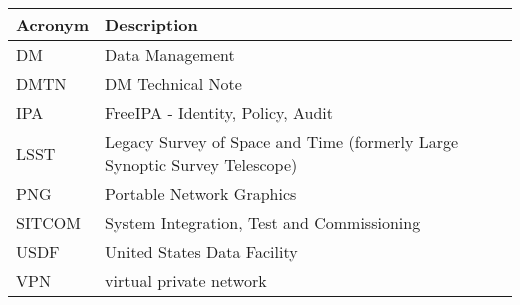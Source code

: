 \addtocounter{table}{-1}
\begin{longtable}{p{}p{}}\hline
\textbf{Acronym} & \textbf{Description}  \\\hline

DM & Data Management \\\hline
DMTN & DM Technical Note \\\hline
IPA & FreeIPA - Identity, Policy, Audit \\\hline
LSST & Legacy Survey of Space and Time (formerly Large Synoptic Survey Telescope) \\\hline
PNG & Portable Network Graphics \\\hline
SITCOM & System Integration, Test and Commissioning \\\hline
USDF & United States Data Facility \\\hline
VPN & virtual private network \\\hline
\end{longtable}
